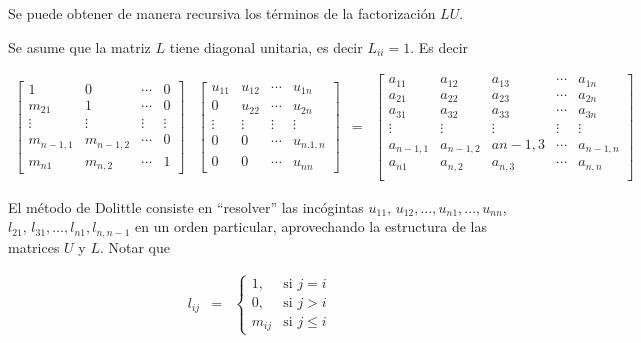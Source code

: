 \documentclass[
]{article}
\begin{document}
Se puede obtener de manera recursiva los términos de la factorización
\(LU\).

Se asume que la matriz \(L\) tiene diagonal unitaria, es decir
\(L_{ii}= 1\). Es decir

\begin{equation}
\begin{array}{cccc}
   \begin{bmatrix} 
       1        &    0    & \cdots & 0   \\
       m_{21}   &    1    & \cdots & 0   \\
     \vdots     & \vdots  & \vdots & \vdots \\
     m_{n-1,1}     & m_{n-1,2} & \cdots & 0 \\
     m_{n1}     & m_{n,2} & \cdots & 1  
  \end{bmatrix} & 
  \begin{bmatrix} 
      u_{11}  &    u_{12}  & \cdots & u_{1n}   \\
       0      &    u_{22}  & \cdots & u_{2n}   \\
     \vdots   & \vdots     & \vdots & \vdots \\
       0      &  0         & \cdots & u_{n.1,n} \\
       0      &  0         & \cdots & u_{nn}  
  \end{bmatrix} &
  = 
  &
  \begin{bmatrix} 
     a_{11} & a_{12}      & a_{13}     & \cdots & a_{1n}       \\ 
     a_{21} & a_{22}      & a_{23}     & \cdots & a_{2n}       \\
     a_{31} & a_{32}      & a_{33}     & \cdots & a_{3n}       \\
    \vdots  & \vdots      & \vdots     & \vdots & \vdots       \\
     a_{n-1,1}& a_{n-1,2} & a{n-1,3}   & \cdots & a_{n-1,n}    \\
     a_{n1} & a_{n,2}     & a_{n,3}    & \cdots & a_{n,n}     \\
  \end{bmatrix}
\end{array}
\end{equation}

El método de Dolittle consiste en ``resolver'' las incógintas
\(u_{11},\,u_{12},\ldots,u_{n1},\ldots,u_{nn}\),
\(l_{21},\,l_{31},\ldots,l_{n1},l_{n,n-1}\) en un orden particular,
aprovechando la estructura de las matrices \(U\) y \(L\). Notar que

\begin{equation}
\begin{array}{ccc}
l_{ij} &  = &\begin{cases}
              1,        & \text{si $j=i$}\\
              0,        & \text{si $j>i$}\\
              m_{ij}    & \text{si $j \leq i$}
            \end{cases}
\end{array}
\end{equation}
\end{document}
